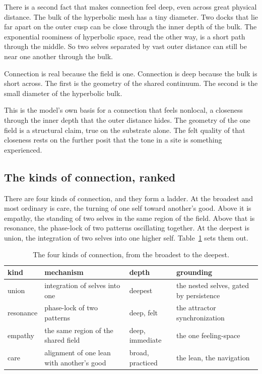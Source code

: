 There is a second fact that makes connection feel deep, even across great physical distance. The bulk of the hyperbolic mesh has a tiny diameter. Two docks that lie far apart on the outer cusp can be close through the inner depth of the bulk. The exponential roominess of hyperbolic space, read the other way, is a short path through the middle. So two selves separated by vast outer distance can still be near one another through the bulk.

\begin{principle}
Connection is real because the field is one. Connection is deep because the bulk is short across. The first is the geometry of the shared continuum. The second is the small diameter of the hyperbolic bulk.
\end{principle}

This is the model's own basis for a connection that feels nonlocal, a closeness through the inner depth that the outer distance hides. The geometry of the one field is a structural claim, true on the substrate alone. The felt quality of that closeness rests on the further posit that the tone in a site is something experienced.

\subsection{The kinds of connection, ranked}

There are four kinds of connection, and they form a ladder. At the broadest and most ordinary is care, the turning of one self toward another's good. Above it is empathy, the standing of two selves in the same region of the field. Above that is resonance, the phase-lock of two patterns oscillating together. At the deepest is union, the integration of two selves into one higher self. Table~\ref{tab:loves} sets them out.

\begin{table}[ht]
\centering
\begin{tabular}{@{}llll@{}}
\toprule
kind & mechanism & depth & grounding \\
\midrule
union & integration of selves into one & deepest & the nested selves, gated by persistence \\
resonance & phase-lock of two patterns & deep, felt & the attractor synchronization \\
empathy & the same region of the shared field & deep, immediate & the one feeling-space \\
care & alignment of one lean with another's good & broad, practiced & the lean, the navigation \\
\bottomrule
\end{tabular}
\caption{The four kinds of connection, from the broadest to the deepest.}
\label{tab:loves}
\end{table}

